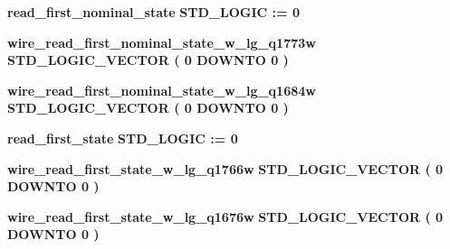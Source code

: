 \begin{DoxyCompactItemize}
\item 
{\bf read\+\_\+first\+\_\+nominal\+\_\+state} {\bfseries \textcolor{comment}{S\+T\+D\+\_\+\+L\+O\+G\+IC}\textcolor{vhdlchar}{ }\textcolor{vhdlchar}{ }\textcolor{vhdlchar}{\+:}\textcolor{vhdlchar}{=}\textcolor{vhdlchar}{ }\textcolor{vhdlchar}{ }\textcolor{vhdlchar}{\textquotesingle{}}\textcolor{vhdlchar}{ } \textcolor{vhdldigit}{0} \textcolor{vhdlchar}{ }\textcolor{vhdlchar}{\textquotesingle{}}\textcolor{vhdlchar}{ }} 
\item 
{\bf wire\+\_\+read\+\_\+first\+\_\+nominal\+\_\+state\+\_\+w\+\_\+lg\+\_\+q1773w} {\bfseries \textcolor{comment}{S\+T\+D\+\_\+\+L\+O\+G\+I\+C\+\_\+\+V\+E\+C\+T\+OR}\textcolor{vhdlchar}{ }\textcolor{vhdlchar}{(}\textcolor{vhdlchar}{ }\textcolor{vhdlchar}{ } \textcolor{vhdldigit}{0} \textcolor{vhdlchar}{ }\textcolor{keywordflow}{D\+O\+W\+N\+TO}\textcolor{vhdlchar}{ }\textcolor{vhdlchar}{ } \textcolor{vhdldigit}{0} \textcolor{vhdlchar}{ }\textcolor{vhdlchar}{)}\textcolor{vhdlchar}{ }} 
\item 
{\bf wire\+\_\+read\+\_\+first\+\_\+nominal\+\_\+state\+\_\+w\+\_\+lg\+\_\+q1684w} {\bfseries \textcolor{comment}{S\+T\+D\+\_\+\+L\+O\+G\+I\+C\+\_\+\+V\+E\+C\+T\+OR}\textcolor{vhdlchar}{ }\textcolor{vhdlchar}{(}\textcolor{vhdlchar}{ }\textcolor{vhdlchar}{ } \textcolor{vhdldigit}{0} \textcolor{vhdlchar}{ }\textcolor{keywordflow}{D\+O\+W\+N\+TO}\textcolor{vhdlchar}{ }\textcolor{vhdlchar}{ } \textcolor{vhdldigit}{0} \textcolor{vhdlchar}{ }\textcolor{vhdlchar}{)}\textcolor{vhdlchar}{ }} 
\item 
{\bf read\+\_\+first\+\_\+state} {\bfseries \textcolor{comment}{S\+T\+D\+\_\+\+L\+O\+G\+IC}\textcolor{vhdlchar}{ }\textcolor{vhdlchar}{ }\textcolor{vhdlchar}{\+:}\textcolor{vhdlchar}{=}\textcolor{vhdlchar}{ }\textcolor{vhdlchar}{ }\textcolor{vhdlchar}{\textquotesingle{}}\textcolor{vhdlchar}{ } \textcolor{vhdldigit}{0} \textcolor{vhdlchar}{ }\textcolor{vhdlchar}{\textquotesingle{}}\textcolor{vhdlchar}{ }} 
\item 
{\bf wire\+\_\+read\+\_\+first\+\_\+state\+\_\+w\+\_\+lg\+\_\+q1766w} {\bfseries \textcolor{comment}{S\+T\+D\+\_\+\+L\+O\+G\+I\+C\+\_\+\+V\+E\+C\+T\+OR}\textcolor{vhdlchar}{ }\textcolor{vhdlchar}{(}\textcolor{vhdlchar}{ }\textcolor{vhdlchar}{ } \textcolor{vhdldigit}{0} \textcolor{vhdlchar}{ }\textcolor{keywordflow}{D\+O\+W\+N\+TO}\textcolor{vhdlchar}{ }\textcolor{vhdlchar}{ } \textcolor{vhdldigit}{0} \textcolor{vhdlchar}{ }\textcolor{vhdlchar}{)}\textcolor{vhdlchar}{ }} 
\item 
{\bf wire\+\_\+read\+\_\+first\+\_\+state\+\_\+w\+\_\+lg\+\_\+q1676w} {\bfseries \textcolor{comment}{S\+T\+D\+\_\+\+L\+O\+G\+I\+C\+\_\+\+V\+E\+C\+T\+OR}\textcolor{vhdlchar}{ }\textcolor{vhdlchar}{(}\textcolor{vhdlchar}{ }\textcolor{vhdlchar}{ } \textcolor{vhdldigit}{0} \textcolor{vhdlchar}{ }\textcolor{keywordflow}{D\+O\+W\+N\+TO}\textcolor{vhdlchar}{ }\textcolor{vhdlchar}{ } \textcolor{vhdldigit}{0} \textcolor{vhdlchar}{ }\textcolor{vhdlchar}{)}\textcolor{vhdlchar}{ }} 

\end{DoxyCompactItemize}
